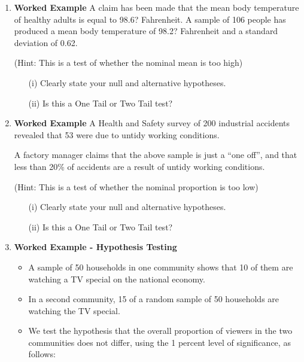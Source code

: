 \documentclass[]{report}
\begin{document}
\begin{enumerate}
	\item \textbf{Worked Example}
	A claim has been made that the mean body temperature of healthy adults is equal to 98.6? Fahrenheit. A sample of 106 people has produced a mean body temperature of 98.2? Fahrenheit and a standard deviation of 0.62. 
	
	(Hint: This is a test of whether the nominal mean is too high)
	\begin{itemize}
		\item[(i)] Clearly state your null and alternative hypotheses.
		\item[(ii)] Is this a One Tail or Two Tail test?
	\end{itemize}
	
	\item \textbf{Worked Example}
	A Health and Safety survey of 200 industrial accidents revealed that 53 
	were due to untidy working conditions.  
	
	A factory manager claims that the above sample is just a “one off”, and that less than 20\% of accidents are a result of untidy working conditions. 
	
	(Hint: This is a test of whether the nominal proportion is too low)
	\begin{itemize}
		\item[(i)] Clearly state your null and alternative hypotheses.
		\item[(ii)] Is this a One Tail or Two Tail test?
	\end{itemize}
	
	
	
	\item \textbf{Worked Example   - Hypothesis Testing}	
	
	\begin{itemize}
		\item A sample of 50 households in one community
		shows that 10 of them are watching a TV special on the national
		economy. 
		\item In a second community, 15 of a random sample of 50
		households are watching the TV special. 
		\item We test the hypothesis
		that the overall proportion of viewers in the two communities does
		not differ, using the 1 percent level of significance, as follows:
	\end{itemize}
	

\end{enumerate}
\end{document}
